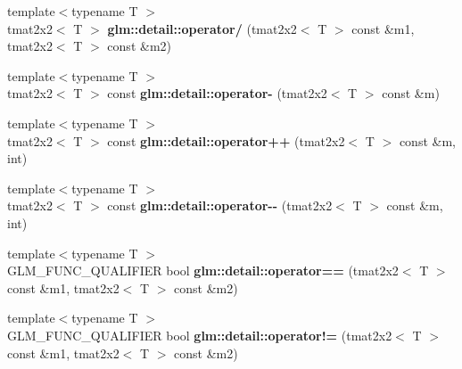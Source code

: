 \begin{DoxyCompactItemize}
\item 
\hypertarget{namespaceglm_1_1detail_a828543ed6885cb013d2709b5a771d37a}{{\footnotesize template$<$typename T $>$ }\\tmat2x2$<$ \-T $>$ {\bfseries glm\-::detail\-::operator/} (tmat2x2$<$ \-T $>$ const \&m1, tmat2x2$<$ \-T $>$ const \&m2)}\label{namespaceglm_1_1detail_a828543ed6885cb013d2709b5a771d37a}

\item 
\hypertarget{namespaceglm_1_1detail_a7e17774948cd9bdb83c818d5bff924e7}{{\footnotesize template$<$typename T $>$ }\\tmat2x2$<$ \-T $>$ const {\bfseries glm\-::detail\-::operator-\/} (tmat2x2$<$ \-T $>$ const \&m)}\label{namespaceglm_1_1detail_a7e17774948cd9bdb83c818d5bff924e7}

\item 
\hypertarget{namespaceglm_1_1detail_a14d2c11191fd707d6e1a86417ff12e27}{{\footnotesize template$<$typename T $>$ }\\tmat2x2$<$ \-T $>$ const {\bfseries glm\-::detail\-::operator++} (tmat2x2$<$ \-T $>$ const \&m, int)}\label{namespaceglm_1_1detail_a14d2c11191fd707d6e1a86417ff12e27}

\item 
\hypertarget{namespaceglm_1_1detail_a5ddaee6882dcf89aed4765da870abeeb}{{\footnotesize template$<$typename T $>$ }\\tmat2x2$<$ \-T $>$ const {\bfseries glm\-::detail\-::operator-\/-\/} (tmat2x2$<$ \-T $>$ const \&m, int)}\label{namespaceglm_1_1detail_a5ddaee6882dcf89aed4765da870abeeb}

\item 
\hypertarget{namespaceglm_1_1detail_a7daa55112beb0033907dff7a695ff975}{{\footnotesize template$<$typename T $>$ }\\\-G\-L\-M\-\_\-\-F\-U\-N\-C\-\_\-\-Q\-U\-A\-L\-I\-F\-I\-E\-R bool {\bfseries glm\-::detail\-::operator==} (tmat2x2$<$ \-T $>$ const \&m1, tmat2x2$<$ \-T $>$ const \&m2)}\label{namespaceglm_1_1detail_a7daa55112beb0033907dff7a695ff975}

\item 
\hypertarget{namespaceglm_1_1detail_afaa47f0fdaa00c1707b046975bf24407}{{\footnotesize template$<$typename T $>$ }\\\-G\-L\-M\-\_\-\-F\-U\-N\-C\-\_\-\-Q\-U\-A\-L\-I\-F\-I\-E\-R bool {\bfseries glm\-::detail\-::operator!=} (tmat2x2$<$ \-T $>$ const \&m1, tmat2x2$<$ \-T $>$ const \&m2)}\label{namespaceglm_1_1detail_afaa47f0fdaa00c1707b046975bf24407}

\end{DoxyCompactItemize}


